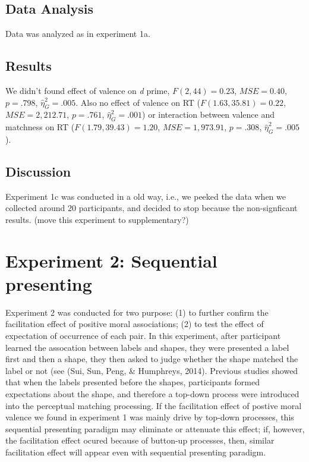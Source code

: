 \documentclass[man]{apa6}
\begin{document}
\hypertarget{data-analysis-3}{%
\subsection{Data Analysis}\label{data-analysis-3}}

Data was analyzed as in experiment 1a.

\hypertarget{results-2}{%
\subsection{Results}\label{results-2}}

We didn't found effect of valence on \emph{d} prime, \(F(2, 44) = 0.23\), \(\mathit{MSE} = 0.40\), \(p = .798\), \(\hat{\eta}^2_G = .005\). Also no effect of valence on RT (\(F(1.63, 35.81) = 0.22\), \(\mathit{MSE} = 2,212.71\), \(p = .761\), \(\hat{\eta}^2_G = .001\)) or interaction between valence and matchness on RT (\(F(1.79, 39.43) = 1.20\), \(\mathit{MSE} = 1,973.91\), \(p = .308\), \(\hat{\eta}^2_G = .005\)).

\hypertarget{discussion-1}{%
\subsection{Discussion}\label{discussion-1}}

Experiment 1c was conducted in a old way, i.e., we peeked the data when we collected around 20 participants, and decided to stop because the non-signficant results. (move this experiment to supplementary?)

\hypertarget{experiment-2-sequential-presenting}{%
\section{Experiment 2: Sequential presenting}\label{experiment-2-sequential-presenting}}

Experiment 2 was conducted for two purpose: (1) to further confirm the facilitation effect of positive moral associations; (2) to test the effect of expectation of occurrence of each pair. In this experiment, after participant learned the assocation between labels and shapes, they were presented a label first and then a shape, they then asked to judge whether the shape matched the label or not (see (Sui, Sun, Peng, \& Humphreys, 2014). Previous studies showed that when the labels presented before the shapes, participants formed expectations about the shape, and therefore a top-down process were introduced into the perceptual matching processing. If the facilitation effect of postive moral valence we found in experiment 1 was mainly drive by top-down processes, this sequential presenting paradigm may eliminate or attenuate this effect; if, however, the facilitation effect ocured because of button-up processes, then, similar facilitation effect will appear even with sequential presenting paradigm.
\end{document}
